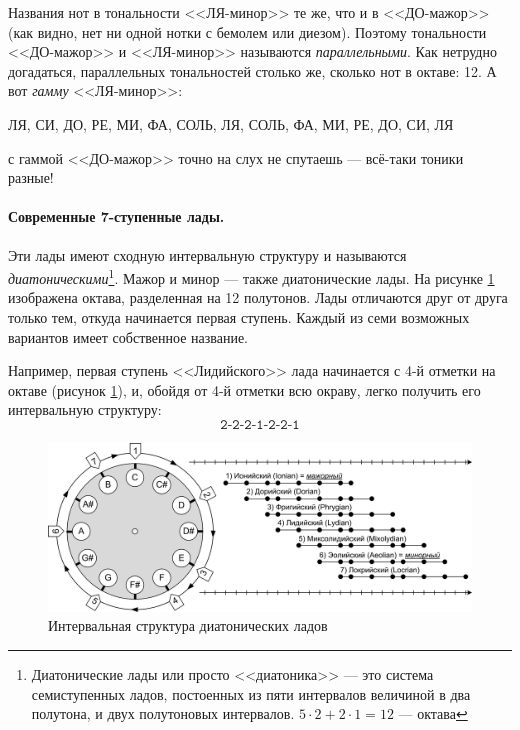 Названия нот в тональности <<ЛЯ-минор>> те же, что и в <<ДО-мажор>> (как видно, нет ни одной нотки с бемолем или диезом). Поэтому тональности <<ДО-мажор>> и <<ЛЯ-минор>> называются \emph{параллельными}. Как нетрудно догадаться, параллельных тональностей столько же, сколько нот в октаве: 12. А вот \emph{гамму} <<ЛЯ-минор>>:
\begin{center}
    ЛЯ, СИ, ДО, РЕ, МИ, ФА, СОЛЬ, ЛЯ, СОЛЬ, ФА, МИ, РЕ, ДО, СИ, ЛЯ
\end{center}
с гаммой <<ДО-мажор>> точно на слух не спутаешь --- всё-таки тоники разные!

\paragraph{Современные 7-ступенные лады.} Эти лады имеют сходную интервальную структуру и называются \emph{диатоническими}\footnote{Диатонические лады или просто <<диатоника>> --- это система семиступенных ладов, постоенных из пяти интервалов величиной в два полутона, и двух полутоновых интервалов. $5\cdot2 + 2\cdot 1 = 12$ --- октава}. Мажор и минор --- также диатонические лады. На рисунке \ref{fig:harmony:lad:modes} изображена октава, разделенная на 12 полутонов. Лады отличаются друг от друга только тем, откуда начинается первая ступень. Каждый из семи возможных вариантов имеет собственное название. 

Например, первая ступень <<Лидийского>> лада начинается с 4-й отметки на октаве (рисунок \ref{fig:harmony:lad:modes}), и, обойдя от 4-й отметки всю окраву, легко получить его интервальную структуру:
\[
    \texttt{2-2-2-1-2-2-1}
\]

\begin{figure}[!ht]
    \centering
    \includegraphics[width=\textwidth]{fig/intervals/modes} 
    \caption{Интервальная структура диатонических ладов}\label{fig:harmony:lad:modes}
\end{figure} 

